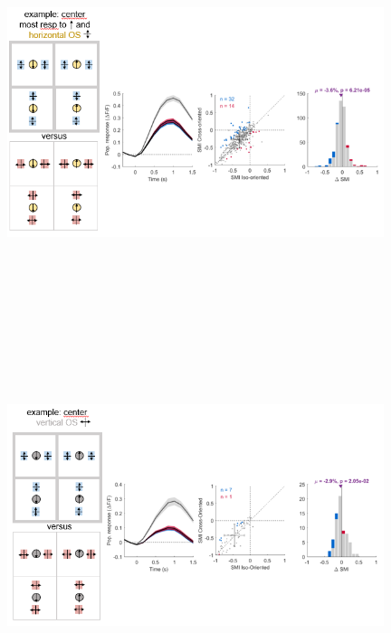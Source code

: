 \begin{figure}[H] \centering \includegraphics[width=11cm,height=11cm,keepaspectratio]{Figures/7.Results/finalPopulation/sel/diagrams/9.png} 
\end{figure}

\begin{figure}[H] \centering \includegraphics[width=11cm,height=11cm,keepaspectratio]{Figures/7.Results/finalPopulation/sel/diagrams/10.png} 
\end{figure}

